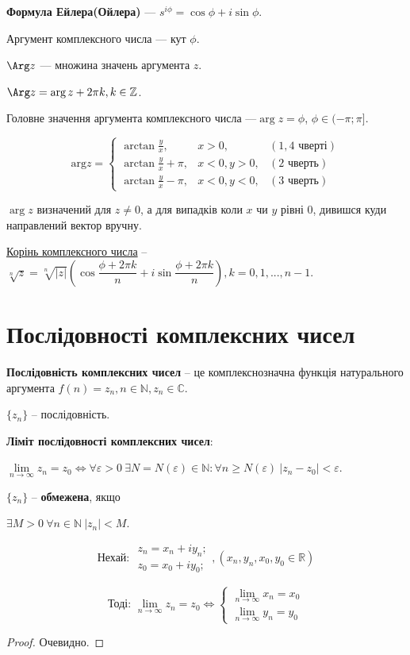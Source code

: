 \textbf{Формула Ейлера(Ойлера)} --- $s^{i \phi} = \cos \phi + i \sin \phi$.

Аргумент комплексного числа --- кут $\phi$.

$\Arg z$ --- множина значень аргумента $z$.

$\Arg z =  \arg z + 2 \pi k, k \in \mathbb{Z}$.

Головне значення аргумента комплексного числа ---$\arg z =  \phi$, $\phi \in ( - \pi; \pi ]$.

$$\text{arg}z = \left\{ \begin{array}{lcr}
\arctan{\frac{y}{x}},       & x>0,      & (1, 4 \text{ чверті}) \\
\arctan{\frac{y}{x}} + \pi, & x<0, y>0, & (2 \text{ чверть}) \\
\arctan{\frac{y}{x}} - \pi, & x<0, y<0, & (3 \text{ чверть})
\end{array}\right. $$

$\arg z$ визначений для $z \neq 0$, а для випадків коли $x$ чи $y$ рівні 0, дивишся куди направлений вектор вручну.

\underline{Корінь комплексного числа} -- $\sqrt[n]{z} = \sqrt[n]{|z|}(\cos\dfrac{\phi+2\pi k}{n} + i\sin\dfrac{\phi+2\pi k}{n}), k=0,1,...,n-1$.



\section{Послідовності комплексних чисел}

\textbf{Послідовність комплексних чисел} -- це комплекснозначна функція натурального аргумента $f(n) = z_n, n\in\mathbb{N}, z_n\in\mathbb{C}$.

$\{z_n\}$ -- послідовність.

\textbf{Ліміт послідовності комплексних чисел}:

$\lim\limits_{n\rightarrow\infty} z_n = z_0 \Leftrightarrow \forall\varepsilon > 0 ~ \exists N = N ( \varepsilon ) \in\mathbb{N} : \forall n \geqslant N(\varepsilon) ~ |z_n-z_0|<\varepsilon$.

$\{z_n\}$ -- \textbf{обмежена}, якщо 

$\exists M>0 ~ \forall n \in \mathbb{N} ~ |z_n|<M$.

\begin{theorem}
$$
\text{Нехай: } \begin{array}{l}
z_n=x_n+iy_n; \\
z_0=x_0+iy_0;
\end{array}, 
(x_n,y_n,x_0,y_0 \in \mathbb{R})
$$

$$
\text{Тоді: }\lim\limits_{n\rightarrow\infty} z_n = z_0 \Leftrightarrow 
\left\{ \begin{array}{l}
\lim\limits_{n\rightarrow\infty} x_n = x_0 \\
\lim\limits_{n\rightarrow\infty} y_n = y_0
\end{array}\right.
$$
\end{theorem}
\begin{proof}
Очевидно.
\end{proof}

